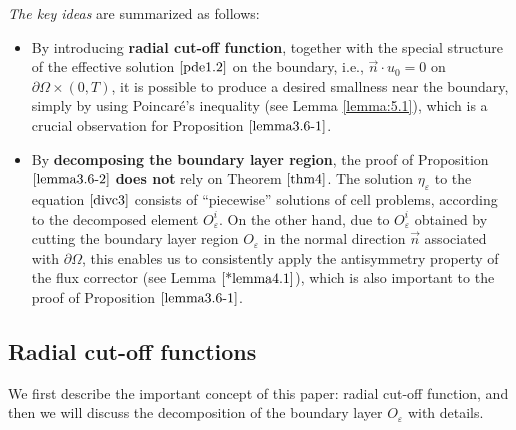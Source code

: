 \documentclass[13pt,CJK]{article}
\theoremstyle{plain}                       %
\newtheorem{remark}[lemma]{Remark}
\theoremstyle{remark}
\numberwithin{equation}{section}
\begin{document}
\emph{The key ideas} are summarized as follows:
\begin{itemize}
  \item By introducing \textbf{radial cut-off function}, together with the special structure
of the effective solution $\eqref{pde1.2}$ on the boundary, i.e.,
$\vec{n}\cdot u_0 = 0$ on $\partial\Omega\times(0,T)$, it is possible to
produce a desired smallness near the boundary, simply by using Poincar\'e's inequality (see Lemma \ref{lemma:5.1}), which is a crucial observation
for Proposition $\ref{lemma3.6-1}$.
  \item By \textbf{decomposing the boundary layer region},
      the proof of Proposition $\ref{lemma3.6-2}$
\textbf{does not} rely on Theorem $\ref{thm4}$.
The solution $\eta_{\varepsilon}$ to the equation
$\eqref{divc3}$ consists of ``piecewise'' solutions of cell problems,
according to the decomposed element $O_\varepsilon^i$.
On the other hand,  due to $O_\varepsilon^{i}$ obtained by cutting
the boundary layer region $O_\varepsilon$ in the normal direction $\vec{n}$ associated with $\partial\Omega$, this enables us to consistently apply the antisymmetry property of the flux corrector (see Lemma $\ref{*lemma4.1}$), which is also important to the proof of Proposition $\ref{lemma3.6-1}$.
\end{itemize}









\subsection{\centering Radial cut-off functions}\label{subsec:4.2}

\noindent
We first describe the important concept of this paper: radial cut-off  function, and then we will discuss the decomposition of the boundary layer $O_\varepsilon$ with details.
\end{document}
